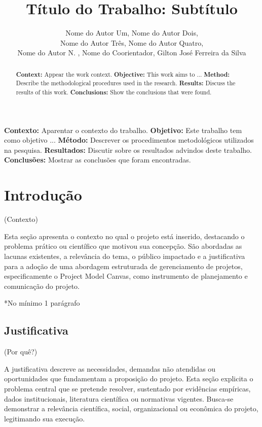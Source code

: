 \documentclass[12pt]{article}
\title{Título do Trabalho: Subtítulo}
\author{Nome do Autor Um\inst{1}, Nome do Autor Dois\inst{1}, \\Nome do Autor Três\inst{1}, Nome do Autor Quatro\inst{1}, \\Nome do Autor N. \inst{1}, Nome do Coorientador\inst{2}, Gilton José Ferreira da Silva\inst{2} }
\begin{document}
 

\maketitle

\begin{abstract}
\textbf {Context:} Appear the work context. \textbf {Objective:} This work aims to ... \textbf {Method:} Describe the methodological procedures used in the research. \textbf {Results:} Discuss the results of this work. \textbf {Conclusions:} Show the conclusions that were found.
\end{abstract}
     
\begin{resumo} 
  \textbf{Contexto:} Aparentar o contexto do trabalho. \textbf{Objetivo:} Este trabalho tem como objetivo ... \textbf{Método:} Descrever os procedimentos metodológicos utilizados na pesquisa. \textbf{Resultados:} Discutir sobre os resultados advindos deste trabalho. \textbf{Conclusões:} Mostrar as conclusões que foram encontradas.
\end{resumo}


\section{Introdução} \label{sec:introducao}
(Contexto)

Esta seção apresenta o contexto no qual o projeto está inserido, destacando o problema prático ou científico que motivou sua concepção. São abordadas as lacunas existentes, a relevância do tema, o público impactado e a justificativa para a adoção de uma abordagem estruturada de gerenciamento de projetos, especificamente o Project Model Canvas, como instrumento de planejamento e comunicação do projeto.

*No mínimo 1 parágrafo


\subsection{Justificativa}
\label{sec:justificativa}
(Por quê?)

A justificativa descreve as necessidades, demandas não atendidas ou oportunidades que fundamentam a proposição do projeto. Esta seção explicita o problema central que se pretende resolver, sustentado por evidências empíricas, dados institucionais, literatura científica ou normativas vigentes. Busca-se demonstrar a relevância científica, social, organizacional ou econômica do projeto, legitimando sua execução.
\end{document}
